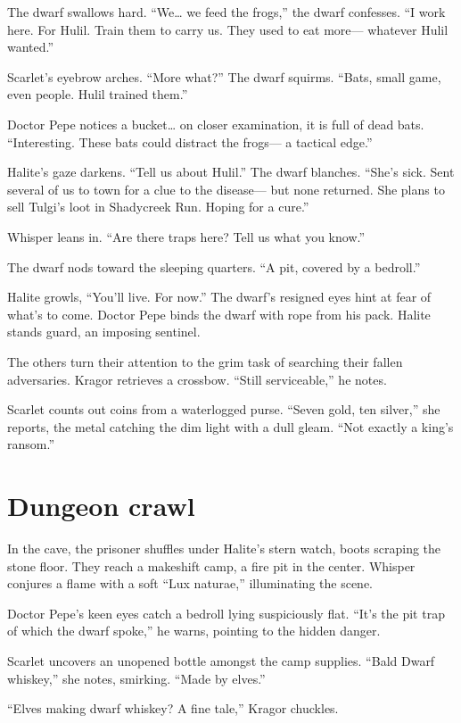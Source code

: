 \documentclass[
  letterpaper,12pt,twoside,twocolumn,openany,
  nodeprecatedcode,bg=full]{dndbook}
\begin{document}
The dwarf swallows hard. ``We\ldots{} we feed the frogs,'' the dwarf
confesses. ``I work here. For Hulil. Train them to carry us. They used
to eat more--- whatever Hulil wanted.''

Scarlet's eyebrow arches. ``More what?'' The dwarf squirms. ``Bats,
small game, even people. Hulil trained them.''

Doctor Pepe notices a bucket\ldots{} on closer examination, it is full
of dead bats. ``Interesting. These bats could distract the frogs--- a
tactical edge.''

Halite's gaze darkens. ``Tell us about Hulil.'' The dwarf blanches.
``She's sick. Sent several of us to town for a clue to the disease---
but none returned. She plans to sell Tulgi's loot in Shadycreek Run.
Hoping for a cure.''

Whisper leans in. ``Are there traps here? Tell us what you know.''

The dwarf nods toward the sleeping quarters. ``A pit, covered by a
bedroll.''

Halite growls, ``You'll live. For now.'' The dwarf's resigned eyes hint
at fear of what's to come. Doctor Pepe binds the dwarf with rope from
his pack. Halite stands guard, an imposing sentinel.

The others turn their attention to the grim task of searching their
fallen adversaries. Kragor retrieves a crossbow. ``Still serviceable,''
he notes.

Scarlet counts out coins from a waterlogged purse. ``Seven gold, ten
silver,'' she reports, the metal catching the dim light with a dull
gleam. ``Not exactly a king's ransom.''

\section{Dungeon crawl}\label{dungeon-crawl}

In the cave, the prisoner shuffles under Halite's stern watch, boots
scraping the stone floor. They reach a makeshift camp, a fire pit in the
center. Whisper conjures a flame with a soft ``Lux naturae,''
illuminating the scene.

Doctor Pepe's keen eyes catch a bedroll lying suspiciously flat. ``It's
the pit trap of which the dwarf spoke,'' he warns, pointing to the
hidden danger.

Scarlet uncovers an unopened bottle amongst the camp supplies. ``Bald
Dwarf whiskey,'' she notes, smirking. ``Made by elves.''

``Elves making dwarf whiskey? A fine tale,'' Kragor chuckles.
\end{document}
